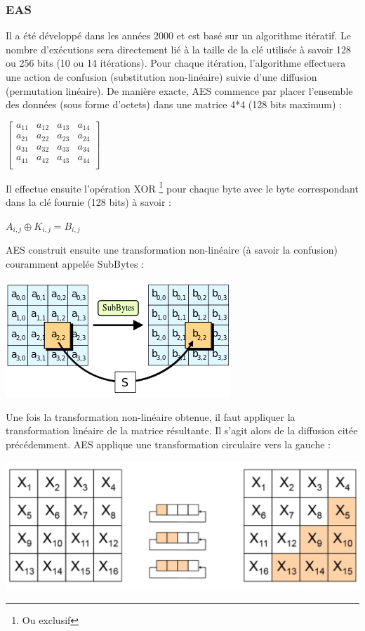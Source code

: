 \documentclass[letterpaper]{article}
\begin{document}
\subsubsection{EAS} Il a été développé dans les années 2000 et est basé sur un algorithme itératif. Le nombre d'exécutions sera directement lié à la taille de la clé utilisée à savoir 128 ou 256 bits (10 ou 14 itérations). Pour chaque itération, l'algorithme effectuera une action de confusion (substitution non-linéaire) suivie d'une diffusion (permutation linéaire). De manière exacte, AES commence par placer l'ensemble des données (sous forme d'octets) dans une matrice 4*4 (128 bits maximum) :
\begin{center}
	$\begin{bmatrix}
	a_{11} & a_{12} & a_{13} & a_{14} \\
	a_{21} & a_{22} & a_{23} & a_{24} \\
	a_{31} & a_{32} & a_{33} & a_{34} \\
	a_{41} & a_{42} & a_{43} & a_{44} \\
	\end{bmatrix}$
\end{center}
Il effectue ensuite l'opération XOR \footnote{Ou exclusif} pour chaque byte avec le byte correspondant dans la clé fournie (128 bits) à savoir : 
\begin{center}
$A_{i,j} \oplus K_{i,j} = B_{i,j}$
\end{center}
AES construit ensuite une transformation non-linéaire (à savoir la confusion) couramment appelée \og SubBytes \fg : 
\begin{center}
\includegraphics[scale=0.7]{imageADD.png}\\
\end{center}
Une fois la transformation non-linéaire obtenue, il faut appliquer la transformation linéaire de la matrice résultante. Il s'agit alors de la diffusion citée précédemment. AES applique une transformation circulaire vers la gauche : 
\begin{center}
\includegraphics[scale=0.165]{imageStep4}\\
\end{center}
\end{document}
